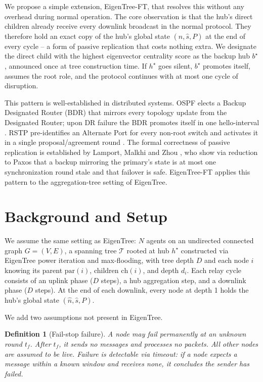 \documentclass{article}
\newtheorem{definition}{Definition}
\newcommand{\merw}{EigenTree}
\newcommand{\merwft}{EigenTree-FT}
\begin{document}
We propose a simple extension, \merwft, that resolves this without any overhead during
normal operation. The core observation is that the hub's direct children already receive
every downlink broadcast in the normal protocol. They therefore hold an exact copy of the
hub's global state $(\hat{n}, \hat{s}, P)$ at the end of every cycle -- a form of passive
replication that costs nothing extra. We designate the direct child with the highest
eigenvector centrality score as the backup hub $b^\star$, announced once at tree construction time.
If $h^\star$ goes silent, $b^\star$ promotes itself, assumes the root role, and the
protocol continues with at most one cycle of disruption.

This pattern is well-established in distributed systems. OSPF elects a Backup Designated
Router (BDR) that mirrors every topology update from the Designated Router; upon DR
failure the BDR promotes itself in one hello-interval \cite{rfc2328}. RSTP pre-identifies
an Alternate Port for every non-root switch and activates it in a single
proposal/agreement round \cite{ieee8021w}. The formal correctness of passive replication
is established by Lamport, Malkhi and Zhou \cite{lamport2009vertical}, who show via
reduction to Paxos that a backup mirroring the primary's state is at most one
synchronization round stale and that failover is safe. \merwft{} applies this pattern
to the aggregation-tree setting of \merw.

\section{Background and Setup}

We assume the same setting as \merw: $N$ agents on an undirected connected graph
$G = (V, E)$, a spanning tree $\mathcal{T}$ rooted at hub $h^\star$ constructed via \merw{}
power iteration and max-flooding, with tree depth $D$ and each node $i$ knowing its
parent $\mathrm{par}(i)$, children $\mathrm{ch}(i)$, and depth $d_i$. Each relay cycle
consists of an uplink phase ($D$ steps), a hub aggregation step, and a downlink phase
($D$ steps). At the end of each downlink, every node at depth 1 holds the hub's global
state $(\hat{n}, \hat{s}, P)$.

We add two assumptions not present in \merw.

\begin{definition}[Fail-stop failure]
    A node may fail permanently at an unknown round $t_f$. After $t_f$, it sends no
    messages and processes no packets. All other nodes are assumed to be live. Failure
    is detectable via timeout: if a node expects a message within a known window and
    receives none, it concludes the sender has failed.
\end{definition}
\end{document}
